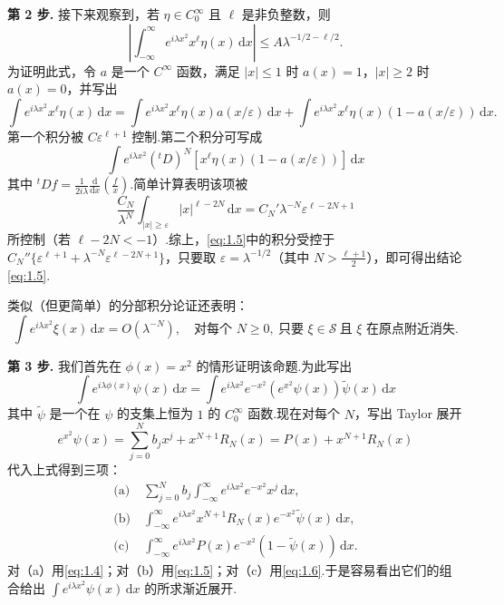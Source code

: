 \documentclass[
  BookTitleCN={傅里叶分析中的振动积分},
  BookTitleEN={Oscillatory Integrals in Fourier Analysis},
  OriginalAuthor={E.~M. Stein},
  OriginalEdition={Proc. Sympos. Pure Math. 35, Part~1},
  OriginalPublisher={American Mathematical Society},
  OriginalYear={1979},
  Translator={翻译及重排},
  ModelUsed={Codex CLI},
  Biblatex=false,
  TranslationDate={2026年8月27日}
]{mathtranslation}
\numberwithin{equation}{chapter}   %
\begin{document}
\textbf{第 2 步.} 接下来观察到，若 $\eta\in C_0^\infty$ 且 $\ell$ 是非负整数，则
\begin{equation}\label{eq:1.5}
  \left|\int_{-\infty}^{\infty}e^{i\lambda x^{2}}x^{\ell}\eta(x)\,\mathrm{d}x\right|\leq A\lambda^{-1/2-\ell/2} .
\end{equation}
为证明此式，令 $a$ 是一个 $C^\infty$ 函数，满足 $|x|\leq1$ 时 $a(x)=1$，$|x|\geq2$ 时 $a(x)=0$，并写出
\[
  \int e^{i\lambda x^{2}}x^{\ell}\eta(x)\,\mathrm{d}x = \int e^{i\lambda x^{2}}x^{\ell}\eta(x)a(x/\varepsilon)\,\mathrm{d}x + \int e^{i\lambda x^{2}}x^{\ell}\eta(x)(1-a(x/\varepsilon))\,\mathrm{d}x .
\]
第一个积分被 $C\varepsilon^{\ell+1}$ 控制.第二个积分可写成
\[
  \int e^{i\lambda x^{2}}({}^{t}D)^{N}[x^{\ell}\eta(x)(1-a(x/\varepsilon))]\,\mathrm{d}x
\]
其中 ${}^{t}\!Df=\frac{1}{2i\lambda}\frac{\mathrm{d}}{\mathrm{d}x}\left(\frac{f}{x}\right)$.简单计算表明该项被
\[
  \frac{C_N}{\lambda^N}\int_{|x|\geq\varepsilon}|x|^{\ell-2N}\,\mathrm{d}x = C_N'\lambda^{-N}\varepsilon^{\ell-2N+1}
\]
所控制（若 $\ell-2N<-1$）.综上，\eqref{eq:1.5}中的积分受控于 $C_N''\{\varepsilon^{\ell+1}+\lambda^{-N}\varepsilon^{\ell-2N+1}\}$，只要取 $\varepsilon=\lambda^{-1/2}$（其中 $N>\frac{\ell+1}{2}$），即可得出结论\eqref{eq:1.5}.

类似（但更简单）的分部积分论证还表明：
\begin{equation}\label{eq:1.6}
  \int e^{i\lambda x^{2}}\xi(x)\,\mathrm{d}x = O(\lambda^{-N}),\quad\text{对每个 }N\geq0,\ \text{只要 }\xi\in\mathscr{S}\ \text{且 }\xi\text{ 在原点附近消失} .
\end{equation}

\textbf{第 3 步.} 我们首先在 $\phi(x)=x^{2}$ 的情形证明该命题.为此写出
\[
  \int e^{i\lambda\phi(x)}\psi(x)\,\mathrm{d}x = \int e^{i\lambda x^{2}}e^{-x^{2}}\left(e^{x^{2}}\psi(x)\right)\tilde\psi(x)\,\mathrm{d}x
\]
其中 $\tilde\psi$ 是一个在 $\psi$ 的支集上恒为 $1$ 的 $C_0^\infty$ 函数.现在对每个 $N$，写出 Taylor 展开
\[
  e^{x^{2}}\psi(x) = \sum_{j=0}^{N}b_{j}x^{j} + x^{N+1}R_{N}(x) = P(x) + x^{N+1}R_{N}(x)
\]
代入上式得到三项：
\begin{align*}
  \text{(a)}&\ \sum_{j=0}^{N}b_{j}\int_{-\infty}^{\infty}e^{i\lambda x^{2}}e^{-x^{2}}x^{j}\,\mathrm{d}x,\\
  \text{(b)}&\ \int_{-\infty}^{\infty}e^{i\lambda x^{2}}x^{N+1}R_{N}(x)e^{-x^{2}}\tilde\psi(x)\,\mathrm{d}x,\\
  \text{(c)}&\ \int_{-\infty}^{\infty}e^{i\lambda x^{2}}P(x)e^{-x^{2}}(1-\tilde\psi(x))\,\mathrm{d}x .
\end{align*}
对（a）用\eqref{eq:1.4}；对（b）用\eqref{eq:1.5}；对（c）用\eqref{eq:1.6}.于是容易看出它们的组合给出 $\int e^{i\lambda x^{2}}\psi(x)\,\mathrm{d}x$ 的所求渐近展开.
\end{document}
